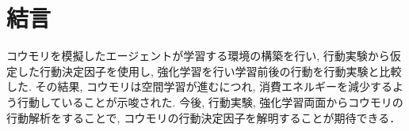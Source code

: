 \documentclass[../main]{subfiles}
\begin{document}
\newpage
\chapter*{結言}
\label{chap:summary}

コウモリを模擬したエージェントが学習する環境の構築を行い, 
行動実験から仮定した行動決定因子を使用し, 
強化学習を行い学習前後の行動を行動実験と比較した.
その結果, コウモリは空間学習が進むにつれ, 
消費エネルギーを減少するよう行動していることが示唆された.
今後, 行動実験, 強化学習両面からコウモリの行動解析をすることで, 
コウモリの行動決定因子を解明することが期待できる．
\end{document}
